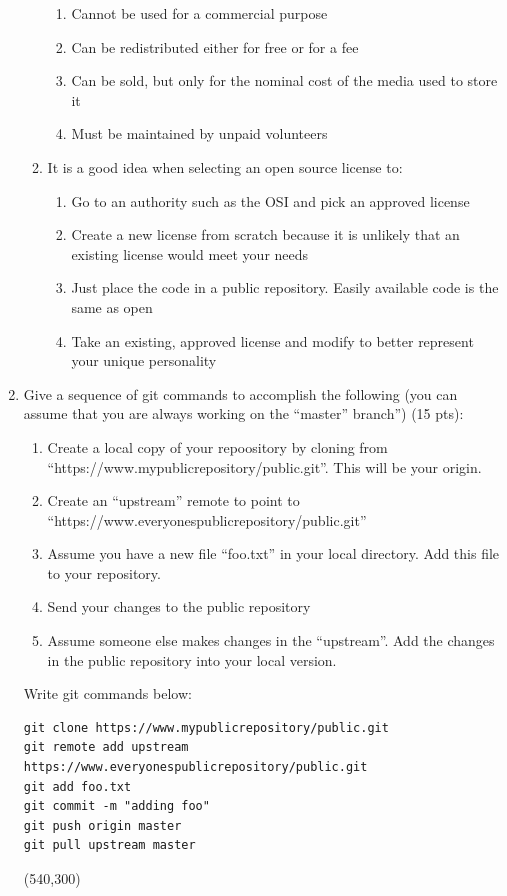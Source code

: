 \documentclass[10pt]{article}
\begin{document}
\begin{enumerate}
\begin{enumerate}
 	\begin{enumerate}
 		\item Cannot be used for a commercial purpose
 		\item Can be redistributed either for free or for a fee
 		\item Can be sold, but only for the nominal cost of the media used to store it
 		\item Must be maintained by unpaid volunteers
 	\end{enumerate}
 	\item It is a good idea when selecting an open source license to:
	\begin{enumerate}
		\item Go to an authority such as the OSI and pick an approved license
		\item Create a new license from scratch because it is unlikely that an existing license would meet your needs
		\item Just place the code in a public repository. Easily available code is the same as open
		\item Take an existing, approved license and modify to better represent your unique personality
	\end{enumerate}
\end{enumerate}
\fi
\newpage
\item Give a sequence of git commands to accomplish the following (you can assume that you are always working on the ``master'' branch'') (15 pts):
\begin{enumerate}
	\item Create a local copy of your repoository by cloning from ``https://www.mypublicrepository/public.git''. This will be your origin.
	\item Create an ``upstream'' remote to point to ``https://www.everyonespublicrepository/public.git''
	\item Assume you have a new file ``foo.txt'' in your local directory. Add this file to your repository.
	\item Send your changes to the public repository
	\item Assume someone else makes changes in the ``upstream''.  Add the changes in the public repository into your local version. 
\end{enumerate}
\bigskip
Write git commands below:
\beginanswers
\begin{lstlisting}
git clone https://www.mypublicrepository/public.git
git remote add upstream https://www.everyonespublicrepository/public.git
git add foo.txt
git commit -m "adding foo"
git push origin master
git pull upstream master
\end{lstlisting}\else
\hspace*{-0.4in}\framebox(540,300){}
\fi
\newpage


\end{enumerate}
\end{document}
